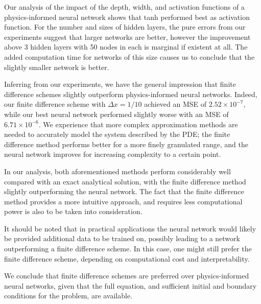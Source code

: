 Our analysis of the impact of the depth, width, and activation functions of a physics-informed neural network shows that tanh performed best as activation function.
For the number and sizes of hidden layers, the pure errors from our experiments suggest that larger networks are better, however the improvement above 3 hidden layers with 50 nodes in each is marginal if existent at all.
The added computation time for networks of this size causes us to conclude that the slightly smaller network is better.

Inferring from our experiments, we have the general impression that finite difference schemes slightly outperform physics-informed neural networks. 
Indeed, our finite difference scheme with $\Delta x = 1/10$ achieved an MSE of $2.52\times 10^{-7}$, while our best neural network performed slightly worse with an MSE of $6.71 \times 10^{-6}$.
We experience that more complex approximation methods are needed to accurately model the system described by the PDE; the finite difference method performs better for a more finely granulated range, and the neural network improves for increasing complexity to a certain point. 

In our analysis, both aforementioned methods perform considerably well compared with an exact analytical solution, with the finite difference method slightly outperforming the neural network. 
The fact that the finite difference method provides a more intuitive approach, and requires less computational power is also to be taken into consideration.

It should be noted that in practical applications the neural network would likely be provided additional data to be trained on, possibly leading to a network outperforming a finite difference scheme. In this case, one might still prefer the finite difference scheme, depending on computational cost and interpretability. 

We conclude that finite difference schemes are preferred over physics-informed neural networks, given that the full equation, and sufficient initial and boundary conditions for the problem, are available. 